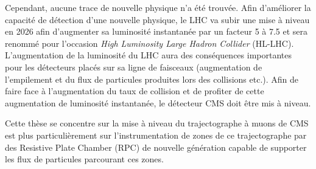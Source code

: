 Cependant, aucune trace de nouvelle physique n'a été trouvée. Afin d'améliorer la capacité de détection d'une nouvelle physique, le LHC va subir une mise à niveau en \num{2026} afin d'augmenter sa luminosité instantanée par un facteur \num{5} à \num{7.5} et sera renommé pour l'occasion \textit{High Luminosity Large Hadron Collider} (HL-LHC). L'augmentation de la luminosité du LHC aura des conséquences importantes pour les détecteurs placés sur sa ligne de faisceaux (augmentation de l'empilement et du flux de particules produites lors des collisions etc.). Afin de faire face à l'augmentation du taux de collision et de profiter de cette augmentation de luminosité instantanée, le détecteur CMS doit être mis à niveau. 

Cette thèse se concentre sur la mise à niveau du trajectographe à muons de CMS est plus particulièrement sur l'instrumentation de zones de ce trajectographe par des Resistive Plate Chamber (RPC) de nouvelle génération capable de supporter les flux de particules parcourant ces zones. 



